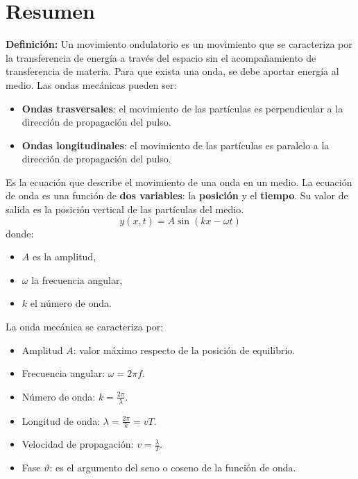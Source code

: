 \section{Resumen}

\begin{tcolorbox}[title=Movimiento Ondulatorio]
  \textbf{Definición:} Un movimiento ondulatorio es un movimiento que se caracteriza por la transferencia de energía a través del espacio sin el acompañamiento de transferencia de materia. Para que exista una onda, se debe aportar energía al medio.
  Las ondas mecánicas pueden ser:
  \begin{itemize}
    \item \textbf{Ondas trasversales}: el movimiento de las partículas es perpendicular a la dirección de propagación del pulso.
    \item \textbf{Ondas longitudinales}: el movimiento de las partículas es paralelo a la dirección de propagación del pulso.
  \end{itemize}
\end{tcolorbox}

\begin{tcolorbox}[title=Ecuación de onda]
  Es la ecuación que describe el movimiento de una onda en un medio. La ecuación de onda es una función de \textbf{dos variables}: la \textbf{posición} y el \textbf{tiempo}. Su valor de salida es la posición vertical de las partículas del medio.
  \[
    y(x, t) = A \sin\left( kx - \omega t \right)
  \]
  donde:
  \begin{itemize}
    \item \(A\) es la amplitud,
    \item \(\omega\) la frecuencia angular,
    \item \(k\) el número de onda.
  \end{itemize}
\end{tcolorbox}

\begin{tcolorbox}[title=Elementos característicos]
  La onda mecánica se caracteriza por:
  \begin{itemize}
    \item Amplitud \(A\): valor máximo respecto de la posición de equilibrio.
    \item Frecuencia angular: \(\omega = 2\pi f\).
    \item Número de onda: \(k = \frac{2\pi}{\lambda}\).
    \item Longitud de onda: \(\lambda = \frac{2\pi}{k} = vT\).
    \item Velocidad de propagación: \(v = \frac{\lambda}{T}\).
    \item Fase \(\vartheta\): es el argumento del seno o coseno de la función de onda.
  \end{itemize}
\end{tcolorbox}

